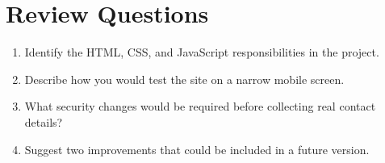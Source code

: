 \documentclass[11pt,openany,oneside]{book}
\begin{document}
\section*{Review Questions}
\begin{enumerate}
\item Identify the HTML, CSS, and JavaScript responsibilities in the project.
\item Describe how you would test the site on a narrow mobile screen.
\item What security changes would be required before collecting real contact details?
\item Suggest two improvements that could be included in a future version.
\end{enumerate}
\end{document}
